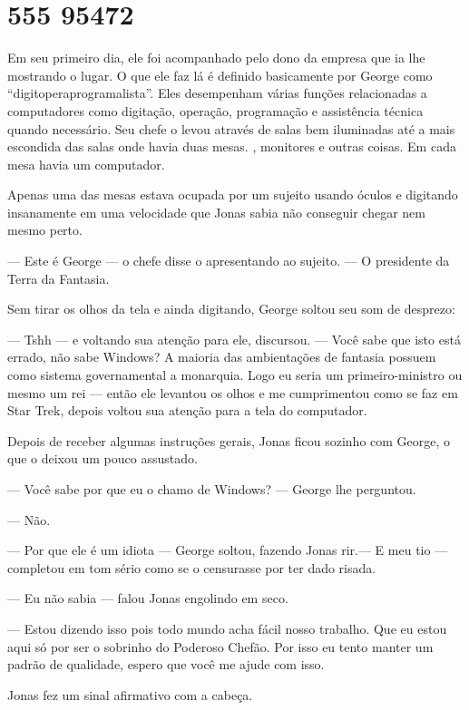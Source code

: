 \chapter{555 95472}

Em seu primeiro dia, ele foi acompanhado pelo dono da empresa que ia lhe mostrando o lugar. O que ele faz lá é definido basicamente por George como ``digitoperaprogramalista''. Eles desempenham várias funções relacionadas a computadores como digitação, operação, programação e assistência técnica quando necessário. Seu chefe o levou através de salas bem iluminadas até a mais escondida das salas onde havia duas mesas. , monitores e outras coisas. Em cada mesa havia um computador.

Apenas uma das mesas estava ocupada\mudanca{,} por um sujeito usando óculos e digitando insanamente\mudanca{,} em uma velocidade que Jonas sabia não conseguir chegar nem mesmo perto.

--- Este é George ---  o chefe disse o apresentando ao sujeito. --- O presidente da Terra da Fantasia.

Sem tirar os olhos da tela e ainda digitando, George soltou seu som de desprezo:

--- Tshh --- e voltando sua atenção para ele, discursou. --- Você sabe que isto está errado, não sabe Windows? A maioria das ambientações de fantasia possuem como sistema governamental a monarquia. Logo eu seria um primeiro-ministro ou mesmo um rei --- então ele levantou os olhos e me cumprimentou como se faz em Star Trek, depois voltou sua atenção para a tela do computador.

Depois de receber algumas instruções gerais, Jonas ficou sozinho com George, o que o deixou um pouco assustado.

--- Você sabe por que eu o chamo de Windows? --- George lhe perguntou.

--- Não.

--- Por que ele é um idiota --- George soltou, fazendo Jonas rir.--- E meu tio --- completou em tom sério como se o censurasse por ter dado risada.

--- Eu não sabia --- falou Jonas engolindo em seco.

--- Estou dizendo isso pois todo mundo acha fácil nosso trabalho. Que eu estou aqui só por ser o sobrinho do Poderoso Chefão. Por isso eu tento manter um padrão de qualidade, espero que você me ajude com isso.

Jonas fez um sinal afirmativo com a cabeça.

